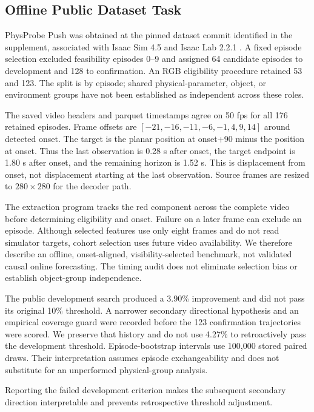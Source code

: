 \documentclass{ieeeaccess}
\begin{document}
\subsection{Offline Public Dataset Task}
PhysProbe Push was obtained at the pinned dataset commit identified in the supplement, associated with Isaac Sim 4.5 and Isaac Lab 2.2.1 \cite{mittal2025isaaclab,physprobe2026dataset}. A fixed episode selection excluded feasibility episodes 0--9 and assigned 64 candidate episodes to development and 128 to confirmation. An RGB eligibility procedure retained 53 and 123. The split is by episode; shared physical-parameter, object, or environment groups have not been established as independent across these roles.

The saved video headers and parquet timestamps agree on 50 fps for all 176 retained episodes. Frame offsets are $[-21,-16,-11,-6,-1,4,9,14]$ around detected onset. The target is the planar position at onset+90 minus the position at onset. Thus the last observation is 0.28 s after onset, the target endpoint is 1.80 s after onset, and the remaining horizon is 1.52 s. This is displacement from onset, not displacement starting at the last observation. Source frames are resized to $280\times280$ for the decoder path.

The extraction program tracks the red component across the complete video before determining eligibility and onset. Failure on a later frame can exclude an episode. Although selected features use only eight frames and do not read simulator targets, cohort selection uses future video availability. We therefore describe an offline, onset-aligned, visibility-selected benchmark, not validated causal online forecasting. The timing audit does not eliminate selection bias or establish object-group independence.

The public development search produced a 3.90\% improvement and did not pass its original 10\% threshold. A narrower secondary directional hypothesis and an empirical coverage guard were recorded before the 123 confirmation trajectories were scored. We preserve that history and do not use 4.27\% to retroactively pass the development threshold. Episode-bootstrap intervals use 100,000 stored paired draws. Their interpretation assumes episode exchangeability and does not substitute for an unperformed physical-group analysis.

Reporting the failed development criterion makes the subsequent secondary direction interpretable and prevents retrospective threshold adjustment.
\end{document}
